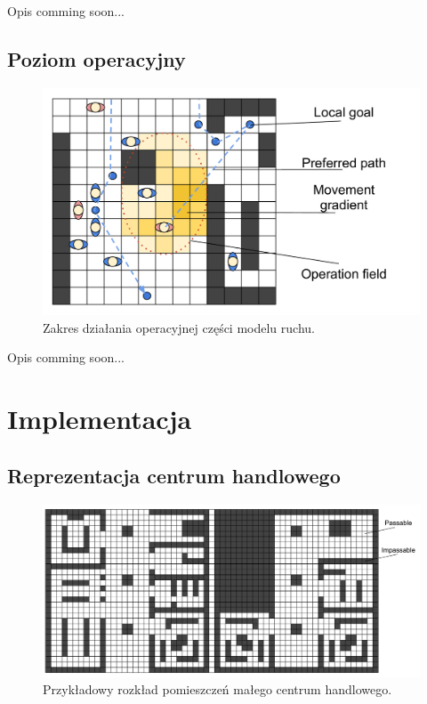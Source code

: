 \documentclass[a4paper, 12pt]{article}
\begin{document}
\noindent
Opis comming soon...

        \subsection{Poziom operacyjny}
        \label{sec:operational}

        \begin{figure}[h!]
            \centering
            \includegraphics[scale=0.3]{./img/Operative.pdf}
            \caption{Zakres działania operacyjnej części modelu ruchu.}
            \label{fig:operational}
        \end{figure}

\noindent
Opis comming soon...

\newpage
    \section{Implementacja}
    \label{sec:implementation}

        \subsection{Reprezentacja centrum handlowego}
        \label{sec:mall}

        \begin{figure}[h!]
            \centering
            \includegraphics[scale=0.2]{./img/MallLayout.pdf}
            \caption{Przykładowy rozkład pomieszczeń małego centrum handlowego.}
            \label{fig:mall-layout}
        \end{figure}
\end{document}
